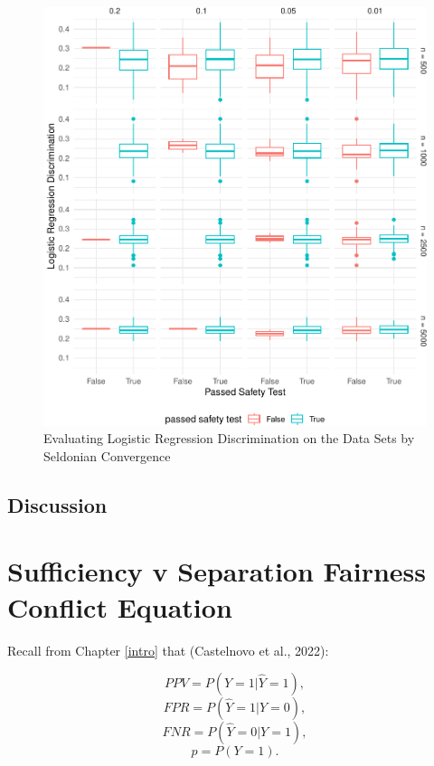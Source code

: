 \documentclass[12pt, twoside]{amherstthesis}
\begin{document}
\begin{figure}

{\centering \includegraphics{Dasha-Asienga_StatThesis_files/figure-latex/ch4fig6-1} 

}

\caption{Evaluating Logistic Regression Discrimination on the Data Sets by Seldonian Convergence}\label{fig:ch4fig6}
\end{figure}
\hypertarget{sim-disc}{%
\section{Discussion}\label{sim-disc}}

\appendix

\hypertarget{appendix-a}{%
\chapter{Sufficiency v Separation Fairness Conflict Equation}\label{appendix-a}}

Recall from Chapter \ref{intro} that (Castelnovo et al., 2022):

\[ PPV = P(Y=1|\hat{Y} = 1),\]
\[ FPR = P(\hat{Y} = 1| Y = 0),\]
\[FNR = P(\hat{Y} = 0| Y = 1),\]
\[ p = P(Y=1).\]
\end{document}

